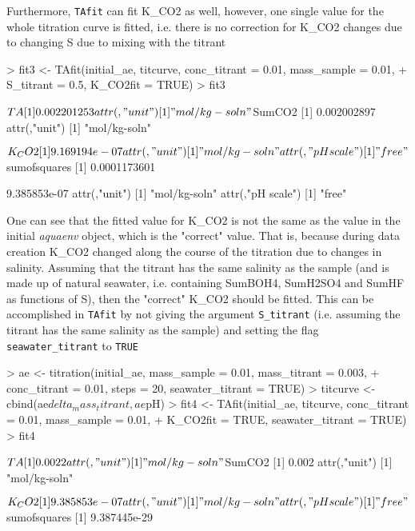 \documentclass[article,nojss]{jss}
\begin{document}
Furthermore, \texttt{TAfit} can fit K\_CO2 as well, however, one single value for the whole titration curve is fitted, i.e. there is no correction for K\_CO2 changes due to changing S due to mixing with the titrant
\begin{Schunk}
\begin{Sinput}
> fit3 <- TAfit(initial_ae, titcurve, conc_titrant = 0.01, mass_sample = 0.01, 
+     S_titrant = 0.5, K_CO2fit = TRUE)
> fit3
\end{Sinput}
\begin{Soutput}
$TA
[1] 0.002201253
attr(,"unit")
[1] "mol/kg-soln"

$SumCO2
[1] 0.002002897
attr(,"unit")
[1] "mol/kg-soln"

$K_CO2
[1] 9.169194e-07
attr(,"unit")
[1] "mol/kg-soln"
attr(,"pH scale")
[1] "free"

$sumofsquares
[1] 0.0001173601
\end{Soutput}
\begin{Soutput}
[1] 9.385853e-07
attr(,"unit")
[1] "mol/kg-soln"
attr(,"pH scale")
[1] "free"
\end{Soutput}
\end{Schunk}

One can see that the fitted value for K\_CO2 is not the same as the value in the initial \textit{aquaenv} object, which is the "correct" value. That is, because during data creation K\_CO2 changed along the course of the titration
due to changes in salinity. Assuming that the titrant has the same salinity as the sample (and is made up of natural seawater, i.e. containing SumBOH4, SumH2SO4 and SumHF as functions of S),
 then the "correct" K\_CO2 should be fitted. This can be accomplished in \texttt{TAfit} by not giving the argument \texttt{S\_titrant} (i.e. assuming the titrant has the 
same salinity as the sample) and 
setting the flag \texttt{seawater\_titrant} to \texttt{TRUE}

\begin{Schunk}
\begin{Sinput}
> ae <- titration(initial_ae, mass_sample = 0.01, mass_titrant = 0.003, 
+     conc_titrant = 0.01, steps = 20, seawater_titrant = TRUE)
> titcurve <- cbind(ae$delta_mass_titrant, ae$pH)
> fit4 <- TAfit(initial_ae, titcurve, conc_titrant = 0.01, mass_sample = 0.01, 
+     K_CO2fit = TRUE, seawater_titrant = TRUE)
> fit4
\end{Sinput}
\begin{Soutput}
$TA
[1] 0.0022
attr(,"unit")
[1] "mol/kg-soln"

$SumCO2
[1] 0.002
attr(,"unit")
[1] "mol/kg-soln"

$K_CO2
[1] 9.385853e-07
attr(,"unit")
[1] "mol/kg-soln"
attr(,"pH scale")
[1] "free"

$sumofsquares
[1] 9.387445e-29
\end{Soutput}
\end{Schunk}
\end{document}
